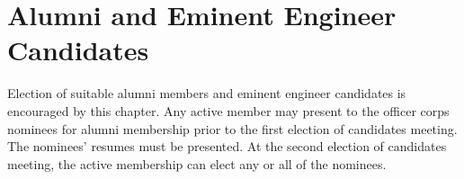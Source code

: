 \section{Alumni and Eminent Engineer Candidates}
Election of suitable alumni members and eminent engineer candidates is encouraged by this chapter.
Any active member may present to the officer corps nominees for alumni membership prior to the first election of candidates meeting.
The nominees' resumes must be presented.
At the second election of candidates meeting, the active membership can elect any or all of the nominees.